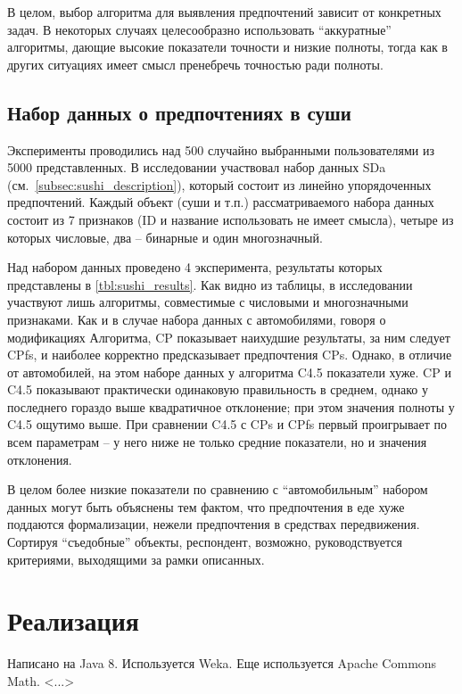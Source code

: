 	В целом, выбор алгоритма для выявления предпочтений зависит от конкретных задач. В некоторых случаях целесообразно использовать ``аккуратные'' алгоритмы, дающие высокие показатели точности и низкие полноты, тогда как в других ситуациях имеет смысл пренебречь точностью ради полноты.  
	
	
	\subsection{Набор данных о предпочтениях в суши} 
	\label{subsec:exp_sushi}
		Эксперименты проводились над 500 случайно выбранными пользователями из 5000 представленных. В исследовании участвовал набор данных SDa (см.~\ref{subsec:sushi_description}), который состоит из линейно упорядоченных предпочтений. Каждый объект (суши и т.п.) рассматриваемого набора данных состоит из 7 признаков (ID и название использовать не имеет смысла), четыре из которых числовые, два – бинарные и один многозначный.
	
		Над набором данных проведено 4 эксперимента, результаты которых представлены в \ref{tbl:sushi_results}. Как видно из таблицы, в исследовании участвуют лишь алгоритмы, совместимые с числовыми и многозначными признаками. Как и в случае набора данных с автомобилями, говоря о модификациях Алгоритма, CP показывает наихудшие результаты, за ним следует CPfs, и наиболее корректно предсказывает предпочтения CPs. Однако, в отличие от автомобилей, на этом наборе данных у алгоритма C4.5 показатели хуже. CP и C4.5 показывают практически одинаковую правильность в среднем, однако у последнего гораздо выше квадратичное отклонение; при этом значения полноты у C4.5 ощутимо выше. При сравнении C4.5 с CPs и CPfs первый проигрывает по всем параметрам – у него ниже не только средние показатели, но и значения отклонения.
		
		В целом более низкие показатели по сравнению с ``автомобильным'' набором данных могут быть объяснены тем фактом, что предпочтения в еде хуже поддаются формализации, нежели предпочтения в средствах передвижения. Сортируя ``съедобные'' объекты, респондент, возможно, руководствуется критериями, выходящими за рамки описанных.

\section{Реализация}
	Написано на Java 8. Используется Weka. Еще используется Apache Commons Math.
	<...>
